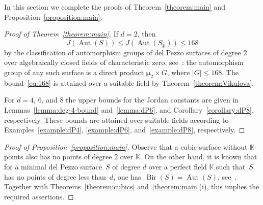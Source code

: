 \documentclass[12pt]{amsart}
\theoremstyle{definition}
\theoremstyle{remark}
\newcommand{\KK}{\mathbb{K}}
\newcommand{\mumu}{{\boldsymbol{\mu}}}
\newcommand{\Aut}{\operatorname{Aut}}
\newcommand{\Bir}{\operatorname{Bir}}
\def \le {\leqslant}
\begin{document}
In this section we complete the proofs of Theorem~\ref{theorem:main}
and Proposition~\ref{proposition:main}.




\begin{proof}[Proof of Theorem~\ref{theorem:main}]
If $d=2$, then
\begin{equation}\label{eq:168}
J(\Aut(S))\le J(\Aut(S_{\bar{\KK}}))\le 168
\end{equation}
by the classification of automorphism groups of del Pezzo surfaces of degree $2$ over algebraically closed fields of characteristic zero,
see~\mbox{\cite[Table~8.9]{Dolgachev}}: the automorphism group of any such surface is a direct product
$\mumu_2\times G$, where $|G|\le 168$.
The bound~\eqref{eq:168} is attained over a suitable field
by Theorem~\ref{theorem:Vikulova}.

For $d=4$, $6$, and $8$ the upper bounds for the Jordan constants are given in
Lemmas~\ref{lemma:deg-4-bound} and~\ref{lemma:dP6},
and Corollary~\ref{corollary:dP8}, respectively. These bounds are attained
over suitable fields according to
Examples~\ref{example:dP4},
\ref{example:dP6}, and~\ref{example:dP8}, respectively.
\end{proof}


\begin{proof}[Proof of Proposition~\ref{proposition:main}]
Observe that a cubic surface without $\KK$-points also has no
points of degree $2$ over $\KK$. On the other hand, it is known that for a minimal del Pezzo
surface~$S$ of degree $d$ over a perfect field $\KK$ such that~$S$ has
no points of degree less than~$d$, one has~\mbox{$\Bir(S)=\Aut(S)$}, see~\mbox{\cite[Theorem~1.6(ii)]{Iskovskikh96}}.
Together with Theorems~\ref{theorem:cubics} and~\ref{theorem:main}(i), this implies the required assertions.
\end{proof}
\end{document}
